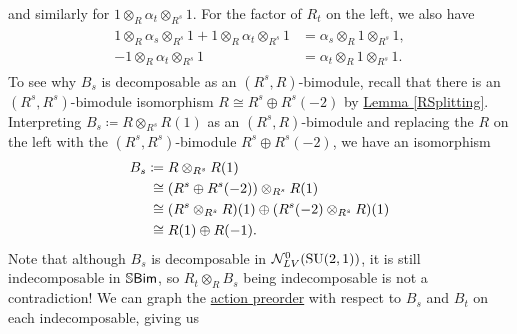 \begin{example}
\begin{align*}
\begin{split}
\end{split}
\end{align*}
\noindent and similarly for $1 \otimes_R \alpha_t \otimes_{R^s} 1$. For the factor of $R_t$ on the left, we also have
\begin{align*}
\begin{split}
1 \otimes_R \alpha_s \otimes_{R^s} 1 + 1 \otimes_R \alpha_t \otimes_{R^s} 1 &= \alpha_s \otimes_R 1 \otimes_{R^s} 1,\\
-1 \otimes_R \alpha_t \otimes_{R^s} 1 &= \alpha_t  \otimes_R 1 \otimes_{R^s} 1.
\end{split}
\end{align*}
\noindent To see why $B_s$ is decomposable as an $(R^s, R)$-bimodule, recall that there is an $(R^s, R^s)$-bimodule isomorphism $R \cong R^s \oplus R^s(-2)$ by \hyperref[RSplitting]{Lemma \ref*{RSplitting}}. Interpreting $B_s \coloneqq R \otimes_{R^s} R(1)$ as an $(R^s, R)$-bimodule and replacing the $R$ on the left with the $(R^s, R^s)$-bimodule $R^s \oplus R^s(-2)$, we have an %
isomorphism
\begin{align*}
\begin{split}
B_s &\coloneqq R \otimes_{R^s} R(1)\\
&\hphantom{\coloneqq}\nhphantom{$\cong$}\cong (R^s \oplus R^s(-2)) \otimes_{R^s} R(1)\\
&\hphantom{\coloneqq}\nhphantom{$\cong$}\cong (R^s \otimes_{R^s} R)(1) \oplus (R^s(-2) \otimes_{R^s} R)(1)\\
&\hphantom{\coloneqq}\nhphantom{$\cong$}\cong R(1) \oplus R(-1).
\end{split}
\end{align*}
\noindent Note that although $B_s$ is decomposable in $\mathcal{N}_{LV}^0(\textup{SU}(2, 1))$, it is still indecomposable in $\mathbb{S}\textnormal{\textsf{Bim}}$, so $R_t \otimes_R B_s$ being indecomposable is not a contradiction! We can graph the \hyperref[ActionPreorder]{action preorder} with respect to $B_s$ and $B_t$ on each indecomposable, giving us\\[5\linespacing]
\begin{center}
\end{center}
\end{example}
